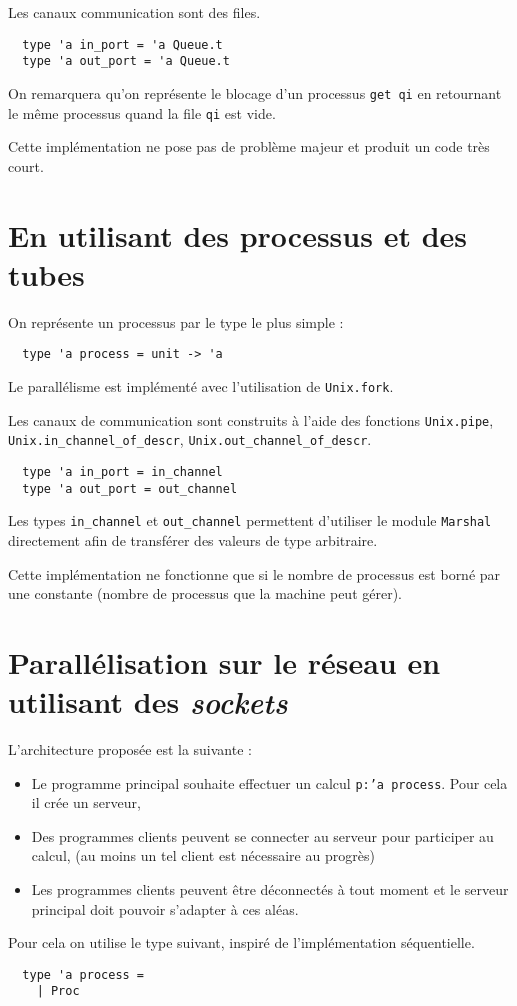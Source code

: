 \documentclass[11pt]{article}
\begin{document}
Les canaux communication sont des files.

\begin{lstlisting}
  type 'a in_port = 'a Queue.t
  type 'a out_port = 'a Queue.t
\end{lstlisting}

On remarquera qu'on repr\'esente le blocage d'un processus {\tt get qi}
en retournant le m\^eme processus quand la file {\tt qi} est vide.

\smallskip

Cette impl\'ementation ne pose pas de probl\`eme majeur
et produit un code tr\`es court.

\section{En utilisant des processus et des tubes}

On repr\'esente un processus par le type le plus simple :

\begin{lstlisting}
  type 'a process = unit -> 'a
\end{lstlisting}

Le parall\'elisme est impl\'ement\'e avec l'utilisation de {\tt Unix.fork}.

\smallskip

Les canaux de communication sont construits \`a l'aide des fonctions
{\tt Unix.pipe},
{\tt Unix.in\_channel\_of\_descr}, {\tt Unix.out\_channel\_of\_descr}.

\begin{lstlisting}
  type 'a in_port = in_channel
  type 'a out_port = out_channel
\end{lstlisting}

Les types {\tt in\_channel} et {\tt out\_channel} permettent d'utiliser
le module {\tt Marshal} directement afin de transf\'erer des valeurs
de type arbitraire.

\smallskip

Cette impl\'ementation ne fonctionne que si le nombre de processus est
born\'e par une constante (nombre de processus que la machine peut g\'erer).

\section{Parall\'elisation sur le r\'eseau en utilisant des {\sl sockets}}

L'architecture propos\'ee est la suivante :

\begin{itemize}
  \item Le programme principal souhaite effectuer un calcul
    {\tt p:'a process}. Pour cela il cr\'ee un serveur,
  \item Des programmes clients peuvent se connecter au serveur pour
    participer au calcul,
    (au moins un tel client est n\'ecessaire au progr\`es)
  \item Les programmes clients peuvent \^etre d\'econnect\'es \`a tout moment
    et le serveur principal doit pouvoir s'adapter \`a ces al\'eas.
\end{itemize}

Pour cela on utilise le type suivant, inspir\'e de l'impl\'ementation
s\'equentielle.

\begin{lstlisting}
  type 'a process =
    | Proc
\end{lstlisting}
\end{document}
